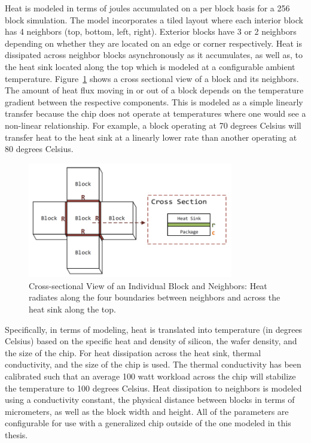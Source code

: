     Heat is modeled in terms of joules accumulated on a per block basis for a 256 block simulation. The model incorporates a tiled layout where each interior block has 4 neighbors (top, bottom, left, right). Exterior blocks have 3 or 2 neighbors depending on whether they are located on an edge or corner respectively. Heat is dissipated across neighbor blocks asynchronously as it accumulates, as well as, to the heat sink located along the top which is modeled at a configurable ambient temperature. Figure~\ref{fig:CrossSection} shows a cross sectional view of a block and its neighbors. The amount of heat flux moving in or out of a block depends on the temperature gradient between the respective components. This is modeled as a simple linearly transfer because the chip does not operate at temperatures where one would see a non-linear relationship. For example, a block operating at 70 degrees Celsius will transfer heat to the heat sink at a linearly lower rate than another operating at 80 degrees Celsius.

     \begin{figure}[htb!]
        \centering
        \includegraphics[width=0.8\textwidth]{Fig/Block-CrossSection.png}
        \caption[Cross-sectional View of an Individual Block and Neighbors]{Cross-sectional View of an Individual Block and Neighbors: Heat radiates along the four boundaries between neighbors and across the heat sink along the top.}
        \label{fig:CrossSection}
    \end{figure}

    Specifically, in terms of modeling, heat is translated into temperature (in degrees Celsius) based on the specific heat and density of silicon, the wafer density, and the size of the chip. For heat dissipation across the heat sink, thermal conductivity, and the size of the chip is used. The thermal conductivity has been calibrated such that an average 100 watt workload across the chip will stabilize the temperature to 100 degrees Celsius. Heat dissipation to neighbors is modeled using a conductivity constant, the physical distance between blocks in terms of micrometers, as well as the block width and height. All of the parameters are configurable for use with a generalized chip outside of the one modeled in this thesis.

